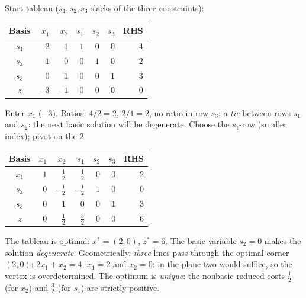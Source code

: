 \begin{solutions}
  \item Start tableau ($s_1,s_2,s_3$ slacks of the three constraints):
        \begin{center}
        \begin{tabular}{c|rrrrr|r}
        \hline
        Basis & $x_1$ & $x_2$ & $s_1$ & $s_2$ & $s_3$ & RHS\\
        \hline
        $s_1$ & $2$ & $1$ & $1$ & $0$ & $0$ & $4$\\
        $s_2$ & $1$ & $0$ & $0$ & $1$ & $0$ & $2$\\
        $s_3$ & $0$ & $1$ & $0$ & $0$ & $1$ & $3$\\
        \hline
        $z$ & $-3$ & $-1$ & $0$ & $0$ & $0$ & $0$\\
        \hline
        \end{tabular}
        \end{center}
        Enter $x_1$ ($-3$). Ratios: $4/2=2$, $2/1=2$, no ratio in row
        $s_3$: a \emph{tie} between rows $s_1$ and $s_2$: the next
        basic solution will be degenerate. Choose the $s_1$-row (smaller
        index); pivot on the $2$:
        \begin{center}
        \begin{tabular}{c|rrrrr|r}
        \hline
        Basis & $x_1$ & $x_2$ & $s_1$ & $s_2$ & $s_3$ & RHS\\
        \hline
        $x_1$ & $1$ & $\tfrac{1}{2}$ & $\tfrac{1}{2}$ & $0$ & $0$ & $2$\\
        $s_2$ & $0$ & $-\tfrac{1}{2}$ & $-\tfrac{1}{2}$ & $1$ & $0$ & $0$\\
        $s_3$ & $0$ & $1$ & $0$ & $0$ & $1$ & $3$\\
        \hline
        $z$ & $0$ & $\tfrac{1}{2}$ & $\tfrac{3}{2}$ & $0$ & $0$ & $6$\\
        \hline
        \end{tabular}
        \end{center}
        The tableau is optimal: $x^{*}=(2,0)$, $z^{*}=6$. The basic
        variable $s_2=0$ makes the solution \emph{degenerate}.
        Geometrically, \emph{three} lines pass through the optimal corner
        $(2,0)$: $2x_1+x_2=4$, $x_1=2$ and $x_2=0$: in the plane two
        would suffice, so the vertex is overdetermined. The optimum is
        \emph{unique}: the nonbasic reduced costs $\tfrac{1}{2}$ (for
        $x_2$) and $\tfrac{3}{2}$ (for $s_1$) are strictly positive.


\end{solutions}
